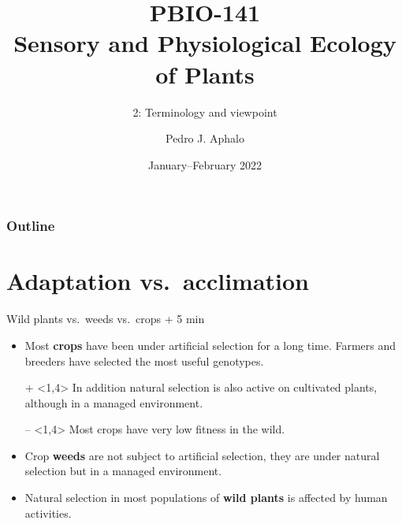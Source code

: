 \documentclass[10pt]{beamer}
\begin{document}
\title{PBIO-141\\Sensory and Physiological Ecology\\of  Plants}
\subtitle{2: Terminology and viewpoint}
\author{Pedro J. Aphalo}
\date{January--February 2022}

\begin{frame}
\maketitle
\end{frame}



\begin{frame}
    \frametitle{Outline}
    \tableofcontents
\end{frame}

\section{Adaptation vs.\ acclimation}

\begin{frame}{\HomeWork Wild plants vs.\ weeds vs.\ crops  + 5 min}
    \begin{itemize}

        \item<1,4> Most \textbf{crops} have been under artificial selection for a
        long time. Farmers and breeders have selected the most useful
        genotypes.

        \item[{\small +}]<1,4> In addition natural selection is also active on cultivated plants,
        although in a managed environment. \DExamples

        \item[{\small --}]<1,4> Most crops have very low fitness in the wild. \DExamples

        \item<2,4> Crop \textbf{weeds} are not subject to artificial selection,
        they are under natural selection but in a managed environment. \DExamples

        \item<3,4> Natural selection in most populations of \textbf{wild plants} is affected by human activities. \DExamples
    \end{itemize}
\end{frame}
\end{document}

